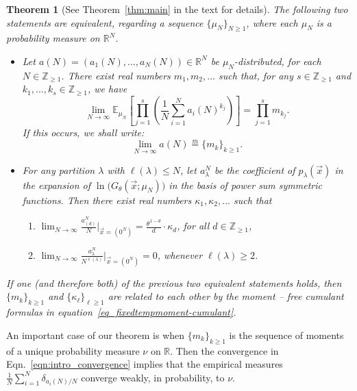 \documentclass[11pt]{article}
\theoremstyle{plain}
\newtheorem{theorem}[lemma]{Theorem}
\newcommand{\Z}{\mathbb Z}
\newcommand{\R}{\mathbb R}
\newcommand{\E}{\mathbb E}
\newcommand{\la}{\lambda}
\newcommand{\vecx}{\vec{x}}
\newcommand{\zeroes}{\vec{x}=(0^N)}
\begin{document}
\begin{theorem}[See Theorem~\ref{thm:main} in the text for details]\label{thm:intro}
    The following two statements are equivalent, regarding a sequence $\{\mu_N\}_{N\ge 1}$, where each $\mu_N$ is a probability measure on $\R^N$.
    \begin{itemize}
        \item Let $a(N)=(a_1(N),...,a_N(N))\in\R^N$ be $\mu_N$-distributed, for each $N\in\Z_{\ge 1}$. There exist real numbers $m_1,m_2,\dots$ such that, for any $s\in\Z_{\ge 1}$ and $k_1,...,k_s\in \Z_{\ge 1}$, we have
    \begin{equation}\label{eqn:intro_convergence}
    \lim_{N\rightarrow\infty}{\E_{\mu_N}\left[\prod_{j=1}^s\left(\frac{1}{N}\sum_{i=1}^N a_i(N)^{k_j}\right)\right]} = \prod_{j=1}^s{m_{k_j}}.
    \end{equation}
    If this occurs, we shall 
    write:
    $$\lim_{N\rightarrow\infty}{a(N)} \stackrel{m}{=} \{m_k\}_{k\ge 1}.$$

        \item For any partition $\la$ with $\ell(\la)\le N$, let $a_\la^N$ be the coefficient of $p_\la(\vecx)$ in the expansion of $\ln\big(G_\theta(\vecx;\mu_N)\big)$ in the basis of power sum symmetric functions.
        Then there exist real numbers $\kappa_1,\kappa_2,\dots$ such that
    \begin{enumerate}[label=(\alph*)]
        \item $\displaystyle\lim_{N\to\infty}{\frac{a_{(d)}^N}{N} \bigg|_{\zeroes}} = \frac{\theta^{1-d}}{d}\cdot\kappa_d$, for all $d\in\Z_{\ge 1}$,
        \item $\displaystyle\lim_{N\to\infty}{\frac{a_\la^N}{N^{\ell(\la)}} \bigg|_{\zeroes}} = 0$, whenever $\ell(\la)\ge 2$.
    \end{enumerate}
    \end{itemize}
    If one (and therefore both) of the previous two equivalent statements holds, then $\{m_k\}_{k\ge 1}$ and $\{\kappa_\ell\}_{\ell\ge 1}$ are related to each other by the moment -- free cumulant formulas in equation~\eqref{eq_fixedtempmoment-cumulant}.
\end{theorem}

An important case of our theorem is when $\{m_k\}_{k\ge 1}$ is the sequence of moments of a unique probability measure $\nu$ on $\R$.
Then the convergence in Eqn.~\eqref{eqn:intro_convergence} implies that the empirical measures $\frac{1}{N}\sum_{i=1}^N{\delta_{a_i(N)/N}}$ converge weakly, in probability, to $\nu$.
\end{document}
